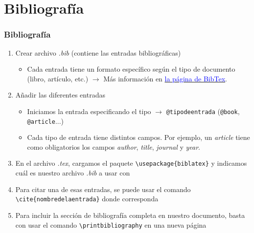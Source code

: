 \section{Bibliografía}

\begin{frame}[fragile]
\frametitle{Bibliografía}

\begin{enumerate}
    \item Crear archivo \textit{.bib} (contiene las entradas bibliográficas)
    \begin{itemize}
        \item Cada entrada tiene un formato específico según el tipo de documento (libro, artículo, etc.) $\rightarrow$ Más información en \href{https://bibtex.eu/es/types/}{\textcolor{blue}{la página de BibTex}}.
    \end{itemize}
    \item Añadir las diferentes entradas
    \begin{itemize}
        \item Iniciamos la entrada especificando el tipo $\rightarrow$ \verb|@tipodeentrada| (\verb|@book|, \verb|@article|...)
        \item Cada tipo de entrada tiene distintos campos. Por ejemplo, un \textit{article} tiene como obligatorios los campos \textit{author}, \textit{title}, \textit{journal} y \textit{year}.
    \end{itemize}
    \item En el archivo \textit{.tex}, cargamos el paquete \verb|\usepackage{biblatex}| y indicamos cuál es nuestro archivo \textit{.bib} a usar con \verb||
    \item Para citar una de esas entradas, se puede usar el comando \verb|\cite{nombredelaentrada}| donde corresponda
    \item Para incluir la sección de bibliografía completa en nuestro documento, basta con usar el comando \verb|\printbibliography| en una nueva página
\end{enumerate}
\end{frame}

